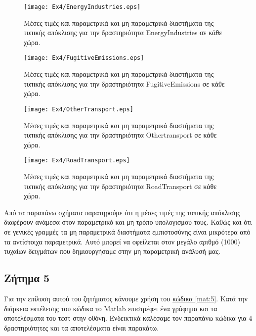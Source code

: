 \documentclass[11pt]{scrartcl} %
\begin{document}
\begin{figure}[H]
\label{fig:z41} 
	\centering
	\texttt{[image: Ex4/EnergyIndustries.eps]}	
\caption{Μέσες τιμές και παραμετρικά και μη παραμετρικά διαστήματα της τυπικής απόκλισης για την δραστηριότητα EnergyIndustries σε κάθε χώρα.}
\end{figure}

\begin{figure}[H]
\label{fig:z42} 
	\centering
	\texttt{[image: Ex4/FugitiveEmissions.eps]}	
\caption{Μέσες τιμές και παραμετρικά και μη παραμετρικά διαστήματα της τυπικής απόκλισης για την δραστηριότητα FugitiveEmissions σε κάθε χώρα.}
\end{figure}

\begin{figure}[H]
\label{fig:z43} 
	\centering
	\texttt{[image: Ex4/OtherTransport.eps]}	
\caption{Μέσες τιμές και παραμετρικά και μη παραμετρικά διαστήματα της τυπικής απόκλισης για την δραστηριότητα Othertransport σε κάθε χώρα.}
\end{figure}

\begin{figure}[H]
\label{fig:z44} 
	\centering
	\texttt{[image: Ex4/RoadTransport.eps]}	
\caption{Μέσες τιμές και παραμετρικά και μη παραμετρικά διαστήματα της τυπικής απόκλισης για την δραστηριότητα RoadTransport σε κάθε χώρα.}
\end{figure}

Από τα παραπάνω σχήματα παρατηρούμε ότι η μέσες τιμές της τυπικής απόκλισης διαφέρουν ανάμεσα στον παραμετρικό και μη τρόπο υπολογισμού τους. Καθώς και ότι σε γενικές γραμμές τα μη παραμετρικά διαστήματα εμπιστοσύνης είναι μικρότερα από τα αντίστοιχα παραμετρικά. Αυτό μπορεί να οφείλεται στον μεγάλο αριθμό (1000) τυχαίων δειγμάτων που δημιουργήσαμε στην μη παραμετρική ανάλυσή μας.  

\subsection{Ζήτημα 5}
\label{subsec:z5}

Για την επίλυση αυτού του ζητήματος κάνουμε χρήση του \hyperref[mat:5]{κώδικα \ref*{mat:5}}. Κατά την διάρκεια εκτέλεσης του κώδικα το Matlab επιστρέφει ένα γράφημα και τα αποτελέσματα του τεστ στην οθόνη. Ενδεικτικά καλέσαμε τον παραπάνω κώδικα για 4 δραστηριότητες και τα αποτελέσματα είναι παρακάτω.
\end{document}
